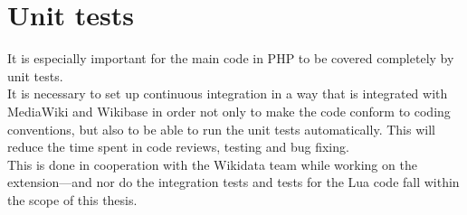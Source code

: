 \section {Unit tests}
It is especially important for the main code in PHP to be covered completely by unit tests. \\
It is necessary to set up continuous integration in a way that is integrated with MediaWiki and Wikibase in order not only to make the code conform to coding conventions, but also to be able to run the unit tests automatically. This will reduce the time spent in code reviews, testing and bug fixing. \\
This is done in cooperation with the Wikidata team while working on the extension---and nor do the integration tests and tests for the Lua code fall within the scope of this thesis. \\ 